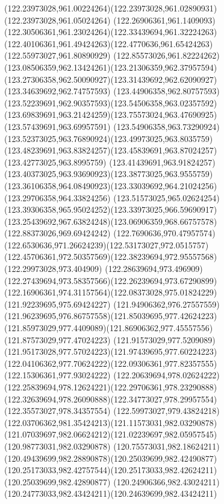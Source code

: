 {    \curveto(122.23973028,961.00224264)(122.23973028,961.02890931)(122.23973028,961.05024264)
    \curveto(122.26906361,961.1409093)(122.30506361,961.23024264)(122.33439694,961.32224263)
    \curveto(122.40106361,961.49424263)(122.4770636,961.65424263)(122.55973027,961.80890929)
    \curveto(122.85573026,961.82224262)(123.08506359,962.13424261)(123.21306359,962.37957594)
    \curveto(123.27306358,962.50090927)(123.31439692,962.62090927)(123.34639692,962.74757593)
    \curveto(123.44906358,962.80757593)(123.52239691,962.90357593)(123.54506358,963.02357592)
    \curveto(123.69839691,963.21424259)(123.75573024,963.47690925)(123.57439691,963.69957591)
    \curveto(123.54906358,963.73290924)(123.52373025,963.76890924)(123.49973025,963.8035759)
    \curveto(123.48239691,963.83824257)(123.45839691,963.87024257)(123.42773025,963.8995759)
    \curveto(123.41439691,963.91824257)(123.40373025,963.93690923)(123.38773025,963.9555759)
    \curveto(123.36106358,964.08490923)(123.33039692,964.21024256)(123.29706358,964.33824256)
    \curveto(123.51573025,965.02624254)(123.39306358,965.95024252)(123.33973025,966.59690917)
    \curveto(123.25439692,967.63824248)(123.06906359,968.66757578)(122.88373026,969.69424242)
    \curveto(122.7690636,970.47957574)(122.6530636,971.26624239)(122.53173027,972.0515757)
    \curveto(122.45706361,972.50357569)(122.38239694,972.95557568)(122.29973028,973.404909)
    \curveto(122.28639694,973.496909)(122.27439694,973.58357566)(122.26239694,973.67290899)
    \curveto(122.16906361,974.31157564)(122.08373028,975.01824229)(121.92239695,975.69424227)
    \curveto(121.94906362,976.27557559)(121.96239695,976.86757558)(121.85039695,977.42624223)
    \curveto(121.85973029,977.4409089)(121.86906362,977.45557556)(121.87573029,977.47024223)
    \curveto(121.91573029,977.5209089)(121.95173028,977.57024223)(121.97439695,977.60224223)
    \curveto(122.04106362,977.70624222)(122.09306361,977.82357555)(122.15306361,977.93024222)
    \curveto(122.20639694,978.02624222)(122.25839694,978.12624221)(122.29706361,978.23290888)
    \curveto(122.32639694,978.26090888)(122.34773027,978.29957554)(122.35573027,978.34357554)
    \curveto(122.59973027,979.43824218)(122.03706362,981.35424213)(121.11573031,982.03290878)
    \curveto(121.07039697,982.06624212)(121.02239697,982.05957545)(120.98773031,982.03290878)
    \curveto(120.75573031,982.18624211)(120.49439699,982.28890878)(120.25039699,982.42490877)
    \curveto(120.25173033,982.42757544)(120.25173033,982.42624211)(120.25039699,982.42890877)
    \curveto(120.24906366,982.43024211)(120.24773033,982.43424211)(120.24639699,982.43424211)
}
